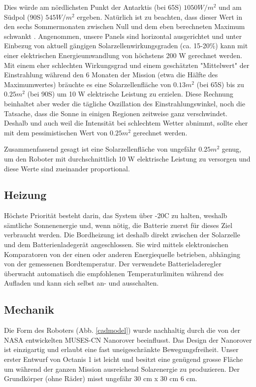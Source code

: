 \documentclass[a4paper,12pt]{article}
\begin{document}
Dies würde am nördlichsten Punkt der Antarktis (bei 65\degree S) $1050 W/m^2$ und am Südpol (90\degree S) $545 W/m^2$ ergeben. Natürlich ist zu beachten, dass dieser Wert in den sechs Sommermonaten zwischen Null und dem eben berechneten Maximum schwankt \cite{pvedu}. Angenommen, unsere Panels sind horizontal ausgerichtet und unter Einbezug von aktuell gängigen Solarzellenwirkungsgraden (ca. 15-20\%) kann mit einer elektrischen Energieumwandlung von höchstens 200 W gerechnet werden. Mit einem eher schlechten Wirkungsgrad und einem geschätzten "Mittelwert" der Einstrahlung während den 6 Monaten der Mission (etwa die Hälfte des Maximumwertes) bräuchte es eine Solarzellenfläche von $0.13m^2$ (bei 65\degree S) bis zu $0.25m^2$ (bei 90\degree S) um 10 W elektrische Leistung zu erzielen. Diese Rechnung beinhaltet aber weder die tägliche Oszillation des Einstrahlungswinkel, noch die Tatsache, dass die Sonne in einigen Regionen zeitweise ganz verschwindet. Deshalb und auch weil die Intensität bei schlechtem Wetter abnimmt, sollte eher mit dem pessimistischen Wert von $0.25m^2$  gerechnet werden.

Zusammenfassend gesagt ist eine Solarzellenfläche von ungefähr $0.25m^2$ genug, um den Roboter mit durchschnittlich 10 W elektrische Leistung zu versorgen und diese Werte sind zueinander proportional.


\subsection{Heizung}

Höchste Priorität besteht darin, das System über -20\degree C zu halten, weshalb sämtliche Sonnenenergie und, wenn nötig, die Batterie zuerst für dieses Ziel verbraucht werden. Die Bordheizung ist deshalb direkt zwischen der Solarzelle und dem Batterienladegerät angeschlossen. Sie wird mittels elektronischen Komparatoren von der einen oder anderen Energiequelle betrieben, abhänging von der gemessenen Bordtemperatur. Der verwendete Batterieladeregler überwacht automatisch die empfohlenen Temperaturlimiten während des Aufladen und kann sich selbst an- und ausschalten.


\subsection{Mechanik}

Die Form des Roboters (Abb. \ref{cadmodel}) wurde nachhaltig durch die von der NASA entwickelten MUSES-CN Nanorover \cite{muses} beeinflusst. Das Design der Nanorover ist einzigartig und erlaubt eine fast uneigeschränkte Bewegungsfreiheit. Unser erster Entwurf von Octanis 1 ist leicht und besitzt eine genügend grosse Fläche um während der ganzen Mission ausreichend Solarenergie zu produzieren. Der Grundkörper (ohne Räder) misst ungefähr 30 cm x 30 cm 6 cm.
\end{document}
